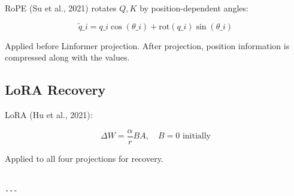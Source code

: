 RoPE (Su et al., 2021) rotates $Q, K$ by position-dependent angles:

\[
\tilde{q}\_i = q\_i \cos(\theta\_i) + \text{rot}(q\_i) \sin(\theta\_i)
\tag{3.9}
\]

Applied before Linformer projection. After projection, position information 
is compressed along with the values.

\subsection{LoRA Recovery}

LoRA (Hu et al., 2021):

\[
\Delta W = \frac{\alpha}{r} B A, \quad B = 0 \text{ initially}
\tag{3.10}
\]

Applied to all four projections for recovery.
\begin{lstlisting}

---
\end{lstlisting}
